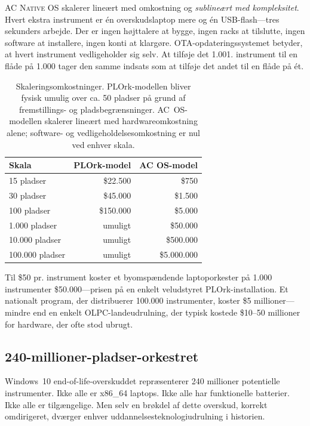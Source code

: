 \documentclass[10pt,letterpaper,twocolumn]{article}
\newcommand{\acos}{\textsc{AC Native OS}}
\begin{document}
\acos{} skalerer line{\ae}rt med omkostning og \emph{subline{\ae}rt med kompleksitet}. Hvert ekstra instrument er \'{e}n overskudslaptop mere og \'{e}n USB-flash---tres sekunders arbejde. Der er ingen h{\o}jttalere at bygge, ingen racks at tilslutte, ingen software at installere, ingen konti at klarg{\o}re. OTA-opdateringssystemet betyder, at hvert instrument vedligeholder sig selv. At tilf{\o}je det 1.001. instrument til en fl{\aa}de p{\aa} 1.000 tager den samme indsats som at tilf{\o}je det andet til en fl{\aa}de p{\aa} \'{e}t.

\begin{table}[h]
\small
\centering
\begin{tabular}{lrr}
\toprule
\textbf{Skala} & \textbf{PLOrk-model} & \textbf{AC OS-model} \\
\midrule
15 pladser & \$22.500 & \$750 \\
30 pladser & \$45.000 & \$1.500 \\
100 pladser & \$150.000 & \$5.000 \\
1.000 pladser & umuligt & \$50.000 \\
10.000 pladser & umuligt & \$500.000 \\
100.000 pladser & umuligt & \$5.000.000 \\
\bottomrule
\end{tabular}
\caption{Skaleringsomkostninger. PLOrk-modellen bliver fysisk umulig over ca. 50 pladser p{\aa} grund af fremstillings- og pladsbegr{\ae}nsninger. AC~OS-modellen skalerer line{\ae}rt med hardwareomkostning alene; software- og vedligeholdelsesomkostning er nul ved enhver skala.}
\label{tab:scaling}
\end{table}

Til \$50 pr. instrument koster et byomsp{\ae}ndende laptoporkester p{\aa} 1.000 instrumenter \$50.000---prisen p{\aa} en enkelt veludstyret PLOrk-installation. Et nationalt program, der distribuerer 100.000 instrumenter, koster \$5 millioner---mindre end en enkelt OLPC-landeudrulning, der typisk kostede \$10--50 millioner~\citep{kraemer2009olpc} for hardware, der ofte stod ubrugt.

\subsection{240-millioner-pladser-orkestret}

Windows~10 end-of-life-overskuddet repr{\ae}senterer 240 millioner potentielle instrumenter. Ikke alle er x86\_64 laptops. Ikke alle har funktionelle batterier. Ikke alle er tilg{\ae}ngelige. Men selv en br{\o}kdel af dette overskud, korrekt omdirigeret, dv{\ae}rger enhver uddannelsesteknologiudrulning i historien.
\end{document}
